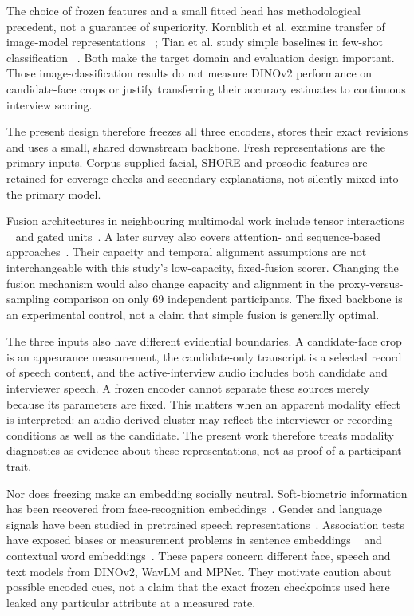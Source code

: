 The choice of frozen features and a small fitted head has methodological precedent, not a
guarantee of superiority. Kornblith et al. examine transfer of image-model representations
~\cite{Kornblith2019Transfer}; Tian et al. study simple baselines in few-shot classification
~\cite{Tian2020FewShot}. Both make the target domain and evaluation design important. Those
image-classification results do not measure DINOv2 performance on candidate-face crops or
justify transferring their accuracy estimates to continuous interview scoring.

The present design therefore freezes all three encoders, stores their exact revisions and uses a
small, shared downstream backbone. Fresh representations are the primary inputs. Corpus-supplied
facial, SHORE and prosodic features are retained for coverage checks and secondary explanations,
not silently mixed into the primary model.

Fusion architectures in neighbouring multimodal work include tensor interactions
~\cite{Zadeh2017TFN} and gated units~\cite{Arevalo2017GMU}. A later survey also covers
attention- and sequence-based approaches~\cite{Zhao2024}. Their capacity and temporal alignment
assumptions are not interchangeable with this study's
low-capacity, fixed-fusion scorer. Changing the fusion mechanism would also change capacity and
alignment in the proxy-versus-sampling comparison on only 69 independent participants. The fixed
backbone is an experimental control, not a claim that simple fusion is generally optimal.

The three inputs also have different evidential boundaries. A candidate-face crop is an appearance
measurement, the candidate-only transcript is a selected record of speech content, and the
active-interview audio includes both candidate and interviewer speech. A frozen encoder cannot
separate these sources merely because its parameters are fixed. This matters when an apparent
modality effect is interpreted: an audio-derived cluster may reflect the interviewer or recording
conditions as well as the candidate. The present work therefore treats modality diagnostics as
evidence about these representations, not as proof of a participant trait.

Nor does freezing make an embedding socially neutral. Soft-biometric information has been
recovered from face-recognition embeddings~\cite{Terhorst2021SoftBiometric}. Gender and language
signals have been studied in pretrained speech representations~\cite{Guillaume2024Speech}.
Association tests have exposed biases or measurement problems in sentence embeddings
~\cite{May2019SentenceBias} and contextual word embeddings~\cite{Kurita2019ContextBias}.
These papers concern different face, speech and text models from DINOv2, WavLM and MPNet. They
motivate caution about possible encoded cues, not a claim that the exact frozen checkpoints
used here leaked any particular attribute at a measured rate.

